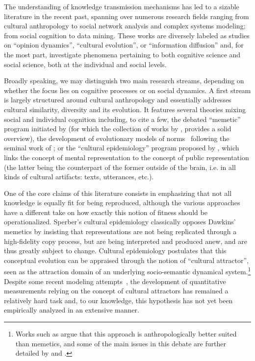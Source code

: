 The understanding of knowledge transmission mechanisms has led to a sizable literature in the recent past, spanning over numerous research fields ranging from cultural anthropology to social network analysis and complex systems modeling; from social cognition to data mining. These works are diversely labeled as studies on ``opinion dynamics'', ``cultural evolution'', or ``information diffusion'' and, for the most part, investigate phenomena pertaining to both cognitive science and social science, both at the individual and social levels.

Broadly speaking, we may distinguish two main research streams, depending on whether the focus lies on cognitive processes or on social dynamics. A first stream is largely structured around cultural anthropology and essentially addresses cultural similarity, diversity and its evolution. It features several theories mixing social and individual cognition including, to cite a few, the debated ``memetic'' program initiated by \citet{Dawkins76} (for which the collection of works by \citealp{Aunger00}, provides a solid overview), the development of evolutionary models of norms~\citep[see for instance][]{Ehrlich05} following the seminal work of \citet{Boyd85}; or the ``cultural epidemiology'' program proposed by \citet{sper:expl}, which links the concept of mental representation to the concept of public representation (the latter being the counterpart of the former outside of the brain, \hbox{i.e.} in all kinds of cultural artifacts: texts, utterances, etc.).

One of the core claims of this literature consists in emphasizing that not all knowledge is equally fit for being reproduced, although the various approaches have a different take on how exactly this notion of fitness should be operationalized. Sperber's cultural epidemiology classically opposes Dawkins' memetics by insisting that representations are not being replicated through a high-fidelity copy process, but are being interpreted and produced anew, and are thus greatly subject to change.
Cultural epidemiology postulates that this conceptual evolution can be appraised through the notion of ``cultural attractor'', seen as the attraction domain of an underlying socio-semantic dynamical system.\footnote{Works such as \citet{Atran03} argue that this approach is anthropologically better suited than memetics, and some of the main issues in this debate are further detailed by \citet{Kuper00} and \citet{Bloch00}.}
Despite some recent modeling attempts~\citep[e.g.][]{Claidiere07}, the development of quantitative measurements relying on the concept of cultural attractors has remained a relatively hard task and, to our knowledge, this hypothesis has not yet been empirically analyzed in an extensive manner.



